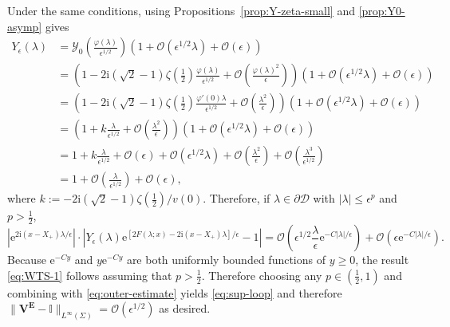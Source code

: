 \documentclass[12pt]{amsart}
\numberwithin{equation}{section}
\newcommand{\ee}{\mathrm{e}}
\newcommand{\ii}{\mathrm{i}}
\newcommand{\SP}{\lambda}
\newcommand{\bigo}[1]{ \mathcal{O}\! \left( #1 \right) }
\begin{document}
Under the same conditions, using Propositions~\ref{prop:Y-zeta-small} and \ref{prop:Y0-asymp} gives
\begin{equation}
\begin{split}
Y_\epsilon(\SP)&=\mathcal{Y}_0\left(\frac{\varphi(\SP)}{\epsilon^{1/2}}\right)\left(1+\bigo{\epsilon^{1/2}\lambda} + \bigo{\epsilon}\right)\\
&=\left(1-2\ii(\sqrt{2}-1)\zeta(\tfrac{1}{2})\frac{\varphi(\SP)}{\epsilon^{1/2}} + \bigo{\frac{\varphi(\SP)^2}{\epsilon}}\right)\left(1+\bigo{\epsilon^{1/2}\lambda}+\bigo{\epsilon}\right)\\
&=\left(1-2\ii(\sqrt{2}-1)\zeta(\tfrac{1}{2})\frac{\varphi'(0)\SP}{\epsilon^{1/2}} + \bigo{\frac{\SP^2}{\epsilon}}\right)\left(1+\bigo{\epsilon^{1/2}\lambda}+\bigo{\epsilon}\right)\\
&=\left(1+k\frac{\lambda}{\epsilon^{1/2}}
+\bigo{\frac{\SP^2}{\epsilon}}\right)\left(1+\bigo{\epsilon^{1/2}\lambda}+\bigo{\epsilon}\right)\\
&=1+k\frac{\lambda}{\epsilon^{1/2}}
+\bigo{\epsilon}+\bigo{\epsilon^{1/2}\lambda}+\bigo{\frac{\lambda^2}{\epsilon}}+\bigo{\frac{\lambda^3}{\epsilon^{1/2}}}\\
&=1+\bigo{\frac{\lambda}{\epsilon^{1/2}}} + \bigo{\epsilon},
\end{split}
\label{eq:Yepsilon-expand-1}
\end{equation}
where $k:=-2\ii(\sqrt{2}-1)\zeta(\frac{1}{2})/v(0)$.
Therefore, if $\SP\in\partial \mathscr{D}$ with $|\SP|\le \epsilon^p$ and $p>\tfrac{1}{2}$,
\begin{equation}
\left|\ee^{2\ii (x-X_+)\SP/\epsilon}\right|\cdot\left|Y_\epsilon(\SP)\ee^{[2F(\SP;x)-2\ii (x-X_+)\SP]/\epsilon}-1\right|
=\bigo{\epsilon^{1/2}\frac{\SP}{\epsilon}\ee^{-C|\SP|/\epsilon}} + \bigo{\epsilon\ee^{-C|\SP|/\epsilon}}.
\label{eq:inner-estimate}
\end{equation}
Because $\ee^{-Cy}$ and $y\ee^{-Cy}$ are both uniformly bounded functions of $y\ge 0$, the result \eqref{eq:WTS-1} follows assuming that $p>\frac{1}{2}$.  Therefore choosing any $p\in (\frac{1}{2},1)$ and combining with \eqref{eq:outer-estimate} yields \eqref{eq:sup-loop} and therefore $\|\mathbf{V}^\mathbf{E}-\mathbb{I}\|_{L^\infty(\Sigma)}=\bigo{\epsilon^{1/2}}$ as desired. 
\end{document}
